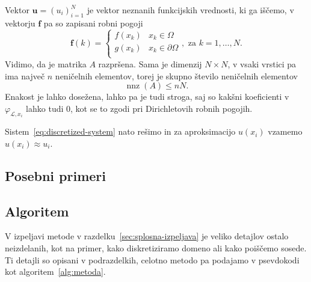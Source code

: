 \documentclass[12pt,a4paper]{article}
\theoremstyle{definition} %
\theoremstyle{plain} %
\renewcommand{\L}{\mathcal{L}}
\renewcommand{\b}{\boldsymbol}
\renewcommand{\phi}{\varphi}
\DeclareMathOperator{\nnz}{nnz}
\begin{document}
Vektor $\b{u} = (u_i)_{i=1}^N$ je vektor neznanih funkcijskih vrednosti, ki ga
iščemo, v vektorju $\b{f}$ pa so zapisani robni pogoji
\[
  \b f(k) = \begin{cases}
    f(x_k) & x_k \in \Omega \\
    g(x_k) & x_k \in \partial\Omega \\
  \end{cases}, \text{ za $k = 1, \ldots, N$}.
\]
Vidimo, da je matrika $A$ razpršena. Sama je dimenzij $N\times N$,
v vsaki vrstici pa ima največ $n$ neničelnih
elementov, torej je skupno število neničelnih elementov
\[
  \nnz(A) \leq nN.
\]
Enakost je lahko dosežena, lahko pa je tudi stroga, saj so kakšni koeficienti v $\phi_{\L,x_i}$ lahko
tudi 0, kot se to zgodi pri Dirichletovih robnih pogojih.

Sistem~\eqref{eq:discretized-system} nato rešimo in za aproksimacijo $u(x_i)$
vzamemo $u(x_i) \approx u_i$.

\subsection{Posebni primeri}
\label{sec:posebni-primeri}

\subsection{Algoritem}
V izpeljavi metode v razdelku~\ref{sec:splosna-izpeljava} je veliko detajlov
ostalo neizdelanih, kot na primer, kako diskretiziramo domeno ali kako poiščemo
sosede. Ti detajli so opisani v podrazdelkih, celotno metodo pa podajamo v
psevdokodi kot algoritem~\ref{alg:metoda}.
\end{document}
